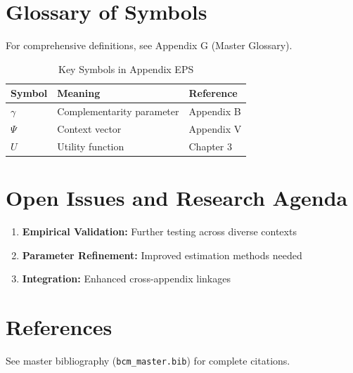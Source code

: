 \section{Glossary of Symbols}
\label{sec:eps-glossary}

For comprehensive definitions, see Appendix G (Master Glossary).

\begin{table}[htbp]
\centering
\caption{Key Symbols in Appendix EPS}
\begin{tabular}{lll}
\toprule
\textbf{Symbol} & \textbf{Meaning} & \textbf{Reference} \\
\midrule
$\gamma$ & Complementarity parameter & Appendix B \\
$\Psi$ & Context vector & Appendix V \\
$U$ & Utility function & Chapter 3 \\
\bottomrule
\end{tabular}
\end{table}



\section{Open Issues and Research Agenda}
\label{sec:eps-open}

\begin{enumerate}
    \item \textbf{Empirical Validation:} Further testing across diverse contexts
    \item \textbf{Parameter Refinement:} Improved estimation methods needed
    \item \textbf{Integration:} Enhanced cross-appendix linkages
\end{enumerate}

\section{References}
\label{sec:eps-references}

See master bibliography (\texttt{bcm\_master.bib}) for complete citations.

\nocite{bcm_master}



